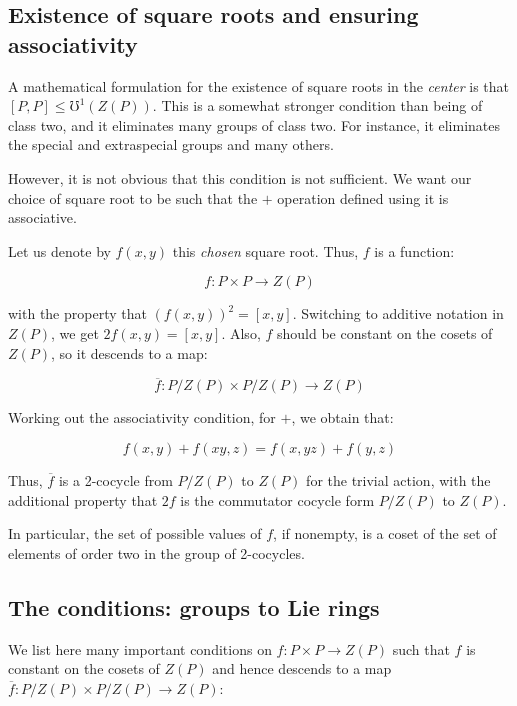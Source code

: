 \documentclass[10pt]{amsart}
\begin{document}
\subsection{Existence of square roots and ensuring associativity}

A mathematical formulation for the existence of square roots in the
{\em center} is that $[P,P] \le \mho^1(Z(P))$. This is a somewhat
stronger condition than being of class two, and it eliminates many
groups of class two. For instance, it eliminates the special and
extraspecial groups and many others.

However, it is not obvious that this condition is not sufficient. We
want our choice of square root to be such that the $+$ operation
defined using it is associative.

Let us denote by $f(x,y)$ this {\em chosen} square root. Thus, $f$ is a
function:

$$f:P \times P \to Z(P)$$

with the property that $(f(x,y))^2 =[x,y]$. Switching to additive
notation in $Z(P)$, we get $2f(x,y) = [x,y]$. Also, $f$ should be
constant on the cosets of $Z(P)$, so it descends to a map:

$$\overline{f}:P/Z(P) \times P/Z(P) \to Z(P)$$

Working out the associativity condition, for $+$, we obtain that:

$$f(x,y) + f(xy,z) = f(x,yz) + f(y,z)$$

Thus, $\overline{f}$ is a 2-cocycle from $P/Z(P)$ to $Z(P)$ for the
trivial action, with the additional property that $2f$ is the
commutator cocycle form $P/Z(P)$ to $Z(P)$.

In particular, the set of possible values of $f$, if nonempty, is a
coset of the set of elements of order two in the group of 2-cocycles.

\subsection{The conditions: groups to Lie rings}

We list here many important conditions on $f: P \times P \to Z(P)$
such that $f$ is constant on the cosets of $Z(P)$ and hence descends
to a map $\overline{f}:P/Z(P) \times P/Z(P) \to Z(P)$:
\end{document}
